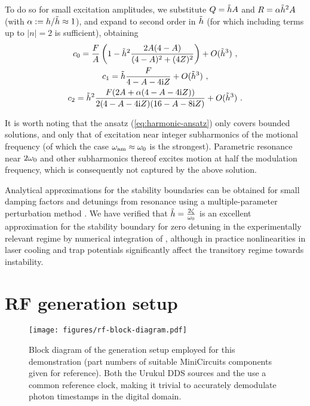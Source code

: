 \documentclass[pra,twocolumn]{revtex4-2}
\begin{document}
To do so for small excitation amplitudes, we substitute $Q = \tilde{h} A$ and $R = \alpha \tilde{h}^2 A$ (with $\alpha := h / \tilde{h} \approx 1$), and expand to second order in $\tilde{h}$ (for which including terms up to $|n| = 2$ is sufficient), obtaining
\begin{equation}
	\begin{gathered}
		c_0 = \frac{F}{A}\left(1 - \tilde{h}^2 \frac{2 A (4 - A)}{(4 - A)^2 + (4 Z)^2}\right) + O(\tilde{h}^3)\ , \\
		c_1 = \tilde{h} \frac{F}{4 - A - 4 \mathrm{i} Z} + O(\tilde{h}^3) \ , \\
		c_2 = \tilde{h}^2 \frac{F(2A + \alpha(4 - A - 4 \mathrm{i} Z))}{2(4 - A - 4 \mathrm{i} Z)(16-A-8\mathrm{i} Z)} + O(\tilde{h}^3) \ .
	\end{gathered}
	\label{eq:second-order-solution}
\end{equation}

It is worth noting that the ansatz (\ref{eq:harmonic-ansatz}) only covers bounded solutions, and only that of excitation near integer subharmonics of the motional frequency (of which the case $\omega_{\textrm{am}} \approx \omega_{\textrm{0}}$ is the strongest).
Parametric resonance near $2 \omega_{\textrm{0}}$ and other subharmonics thereof excites motion at half the modulation frequency, which is consequently not captured by the above solution.

Analytical approximations for the stability boundaries can be obtained for small damping factors and detunings from resonance using a multiple-parameter perturbation method \cite{wuPerturbationMethodFloquet1995}.
We have verified that $\tilde{h} = \frac{2 \zeta}{\omega_{\textrm{0}}}$ is an excellent approximation for the stability boundary for zero detuning in the experimentally relevant regime by numerical integration of , although in practice nonlinearities in laser cooling and trap potentials significantly affect the transitory regime towards instability.


\section{RF generation setup}
\label{sec:rf-setup}

\begin{figure}
	\texttt{[image: figures/rf-block-diagram.pdf]}
	\caption{
		Block diagram of the \RF{} generation setup employed for this demonstration (part numbers of suitable MiniCircuits components given for reference).
		Both the Urukul DDS \RF{} sources and the \FPGA{} use a common reference clock, making it trivial to accurately demodulate photon timestamps in the digital domain.
	}
	\label{fig:rf-chain}
\end{figure}
\end{document}
